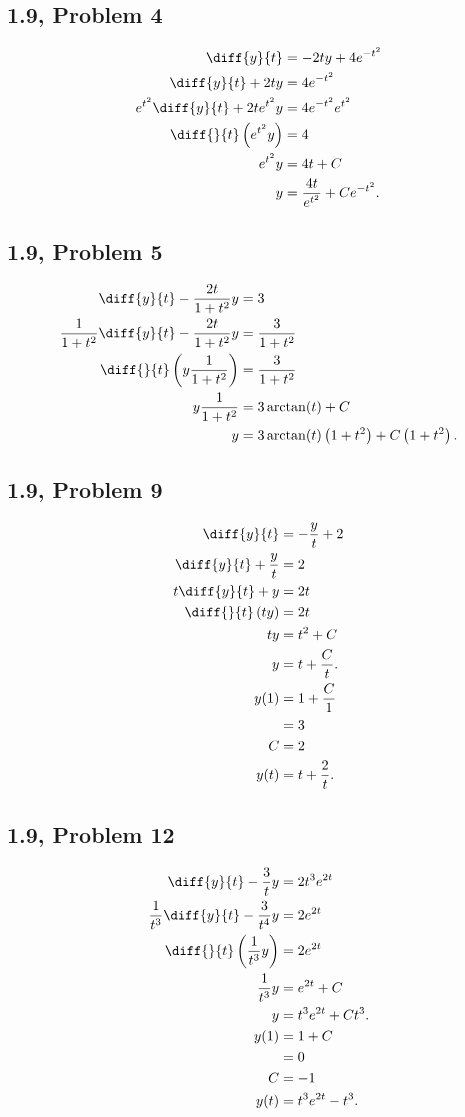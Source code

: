 \documentclass[10pt]{mypackage}
\begin{document}
\subsection{1.9, Problem 4}%
\begin{align*}
  \diff{y}{t} &= -2ty + 4e^{-t^2}\\
  \diff{y}{t} + 2ty &= 4e^{-t^2}\\
  e^{t^2}\diff{y}{t} + 2te^{t^2}y &= 4e^{-t^2}e^{t^2}\\
  \diff{}{t}\left(e^{t^2}y\right) &= 4\\
  e^{t^2}y &= 4t + C\\
  y &= \frac{4t}{e^{t^2}} + Ce^{-t^2}.
\end{align*}
\subsection{1.9, Problem 5}%
\begin{align*}
  \diff{y}{t} - \frac{2t}{1 + t^2}y &= 3\\
  \frac{1}{1 + t^2}\diff{y}{t} - \frac{2t}{1 + t^2}y &= \frac{3}{1 + t^2}\\
  \diff{}{t}\left(y\frac{1}{1+t^2}\right) &= \frac{3}{1+t^2}\\
  y\frac{1}{1+t^2} &= 3\arctan(t) + C\\
  y &= 3\arctan(t)\left(1+t^2\right) + C\left(1 + t^2\right).
\end{align*}
\subsection{1.9, Problem 9}%
\begin{align*}
  \diff{y}{t} &= -\frac{y}{t} + 2\\
  \diff{y}{t} + \frac{y}{t} &= 2\\
  t\diff{y}{t} + y &= 2t\\
  \diff{}{t}\left(ty\right) &= 2t\\
  ty &= t^2 + C\\
  y &= t + \frac{C}{t}.\\
  y(1) &= 1 + \frac{C}{1}\\
       &= 3\\
  C &= 2\\
  y(t) &= t + \frac{2}{t}.
\end{align*}
\subsection{1.9, Problem 12}%
\begin{align*}
  \diff{y}{t} - \frac{3}{t}y &= 2t^3e^{2t}\\
  \frac{1}{t^3}\diff{y}{t} - \frac{3}{t^4}y &= 2e^{2t}\\
  \diff{}{t}\left(\frac{1}{t^3}y\right) &= 2e^{2t}\\
  \frac{1}{t^3}y &= e^{2t} + C\\
  y &= t^3e^{2t} + Ct^3.\\
  y(1) &= 1 + C\\
      &= 0\\
  C &= -1\\
  y(t) &= t^3e^{2t} - t^3.
\end{align*}
\end{document}
